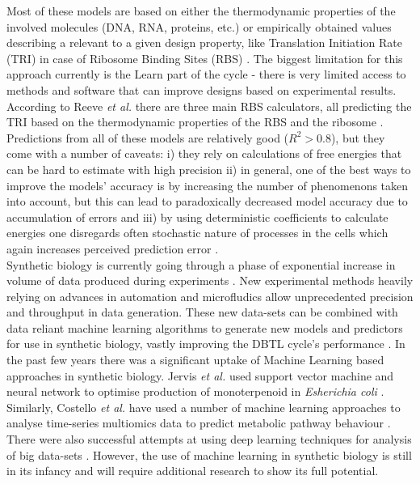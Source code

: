 \documentclass{article}
\begin{document}
Most of these models are based on either the thermodynamic properties of the involved molecules (DNA, RNA, proteins, etc.) or empirically obtained values describing a relevant to a given design property, like Translation Initiation Rate (TRI) in case of Ribosome Binding Sites (RBS) \cite{Xia1998,Chen2013,Reeve2014}.
The biggest limitation for this approach currently is the Learn part of the cycle - there is very limited access to methods and software that can improve designs based on experimental results.\\
According to Reeve \emph{et al.} there are three main RBS calculators, all predicting the TRI based on the thermodynamic properties of the RBS and the ribosome \cite{Seo2013,Na2010,Salis2009}. 
Predictions from all of these models are relatively good ($R^2 >0.8$), but they come with a number of caveats: i) they rely on calculations of free energies that can be hard to estimate with high precision ii) in general, one of the best ways to improve the models' accuracy is by increasing the number of phenomenons taken into account, but this can lead to paradoxically decreased model accuracy due to accumulation of errors \cite{EspahBorujeni2016} and iii) by using deterministic coefficients to calculate energies one disregards often stochastic nature of processes in the cells which again increases perceived prediction error \cite{Goss1998}. \\
Synthetic biology is currently going through a phase of exponential increase in volume of data produced during experiments \cite{Freemont2019}. New experimental methods heavily relying on advances in automation and microfludics allow unprecedented precision and throughput in data generation.
These new data-sets can be combined with data reliant machine learning algorithms to generate new models and predictors for use in synthetic biology, vastly improving the DBTL cycle's performance \cite{Camacho2018}. In the past few years there was a significant uptake of Machine Learning based approaches in synthetic biology.
Jervis \emph{et al.} used support vector machine and neural network to optimise production of monoterpenoid in \emph{Esherichia coli} \cite{Jervis2019}. Similarly, Costello \emph{et al.} have used a number of machine learning approaches to analyse time-series multiomics data to predict metabolic pathway behaviour \cite{Costello2018}.
There were also successful attempts at using deep learning techniques for analysis of big data-sets \cite{Alipanahi2015,Angermueller2016}. However, the use of machine learning in synthetic biology is still in its infancy and will require additional research to show its full potential. \\
\end{document}
